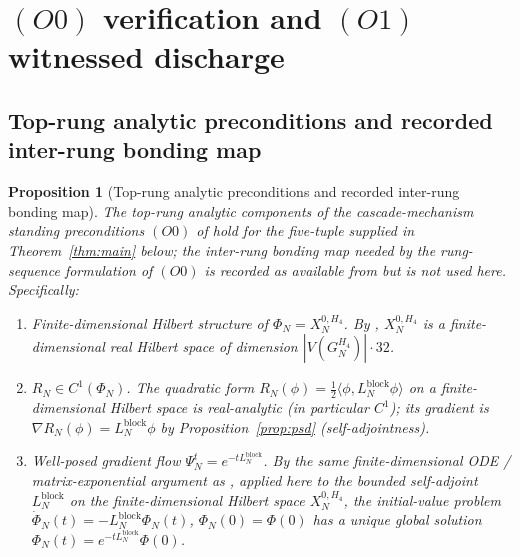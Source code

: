 \documentclass[11pt]{article}
\newtheorem{proposition}[theorem]{Proposition}
\theoremstyle{definition}
\begin{document}
\section{$(O0)$ verification and $(O1)$ witnessed discharge}
\label{sec:o1-discharge}

\subsection{Top-rung analytic preconditions and recorded
inter-rung bonding map}

\begin{proposition}[Top-rung analytic preconditions and recorded
inter-rung bonding map]
\label{prop:o0}
The top-rung analytic components of the cascade-mechanism standing
preconditions $(O0)$ of
\cite[\S 3.4 lines 595--608]{CascadeMechanism} hold for the
five-tuple supplied in Theorem~\ref{thm:main} below; the
inter-rung bonding map needed by the rung-sequence formulation of
$(O0)$ is recorded as available from
\cite[Definition~\texttt{def:p0}, Theorem~\texttt{thm:bonding}]
{RefinementSpaces} but is not used here. Specifically:
\begin{enumerate}[label=\textup{(O0.\arabic*)}, leftmargin=3em]
\item \emph{Finite-dimensional Hilbert structure of $\Phi_N =
  X_N^{0, H_4}$.} By
  \cite[Proposition~\texttt{prop:Xn-Hilbert}]{RefinementSpaces},
  $X_N^{0, H_4}$ is a finite-dimensional real Hilbert space of
  dimension $|V(G_N^{H_4})| \cdot 32$.
\item \emph{$R_N \in C^{1}(\Phi_N)$.} The quadratic form
  $R_N(\phi) = \tfrac12 \langle \phi, L_N^{\mathrm{block}} \phi
  \rangle$ on a finite-dimensional Hilbert space is real-analytic
  (in particular $C^{1}$); its gradient is $\nabla R_N(\phi) =
  L_N^{\mathrm{block}} \phi$ by Proposition~\ref{prop:psd}
  (self-adjointness).
\item \emph{Well-posed gradient flow $\Psi_N^{t} = e^{-t
  L_N^{\mathrm{block}}}$.} By the same finite-dimensional ODE /
  matrix-exponential argument as
  \cite[Theorem~\texttt{thm:flow-exists}]{ClosureDynamics},
  applied here to the bounded self-adjoint $L_N^{\mathrm{block}}$
  on the finite-dimensional Hilbert space $X_N^{0, H_4}$, the
  initial-value problem $\dot\Phi_N(t) = -L_N^{\mathrm{block}}
  \Phi_N(t)$, $\Phi_N(0) = \Phi(0)$ has a unique global solution
  $\Phi_N(t) = e^{-t L_N^{\mathrm{block}}} \Phi(0)$.

\end{enumerate}
\end{proposition}
\end{document}
